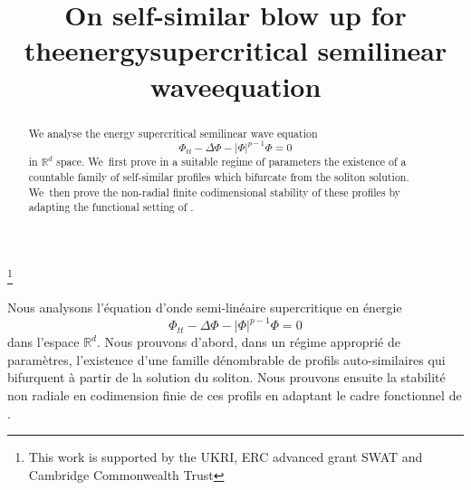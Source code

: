\documentclass[JEP,XML,SOM,Unicode]{cedram}
\theoremstyle{plain}
\theoremstyle{definition}
\begin{document}
\title{On self-similar blow up for the\nobreakspace energy\nobreakspace supercritical semilinear wave\nobreakspace equation}

\author[\initial{J.} \lastname{Kim}]{ }
\address{Department of Pure Mathematics and Mathematical Statistics,
University of Cambridge,\\
Wilberforce Road, Cambridge CB3 0WB, UK}
\urladdr{}

\thanks{This work is supported by the UKRI, ERC advanced grant SWAT and Cambridge Commonwealth Trust}

\begin{abstract}
We analyse the energy supercritical semilinear wave equation
\[
\Phi_{tt}-\Delta\Phi-|\Phi|^{p-1} \Phi=0
\]
in $\mathbb R^d$ space. We~first prove in a suitable regime of parameters the existence of a countable family of self-similar profiles which bifurcate from the soliton solution. We~then prove the non-radial finite codimensional stability of these profiles by adapting the functional setting of \cite{MRRS}.
\end{abstract}





\begin{altabstract}
Nous analysons l'équation d'onde semi-linéaire supercritique en énergie
\[
\Phi_{tt}-\Delta\Phi-|\Phi|^{p-1} \Phi=0
\]
dans l'espace $\mathbb R^d$. Nous prouvons d'abord, dans un régime approprié de paramètres, l'existence d'une famille dénombrable de profils auto-similaires qui bifurquent à partir de la solution du soliton. Nous prouvons ensuite la stabilité non radiale en codimension finie de ces profils en adaptant le cadre fonctionnel de \cite{MRRS}.
\end{altabstract}

\maketitle
\vspace*{-\baselineskip}
\tableofcontents
\end{document}
